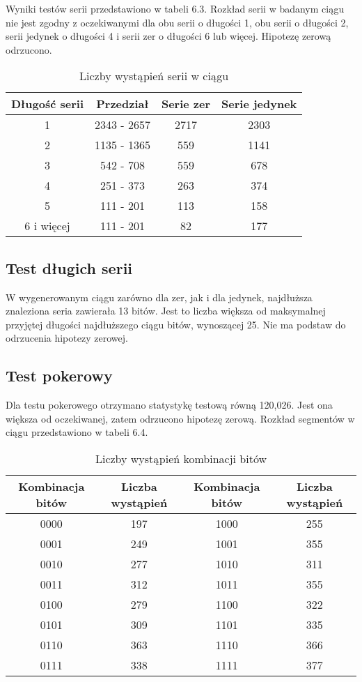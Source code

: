 Wyniki testów serii przedstawiono w tabeli 6.3. Rozkład serii w badanym ciągu nie jest zgodny z oczekiwanymi dla obu 
serii o długości 1, obu serii o długości 2, serii jedynek o długości 4 i serii zer o długości 6 lub więcej. Hipotezę
zerową odrzucono.
\begin{table}[h]
    \centering
    \caption{Liczby wystąpień serii w ciągu}
    \begin{tabular}{|c|c|c|c|} 
        \hline
        Długość serii & Przedział & Serie zer & Serie jedynek \\
        \hline
        1 & 2343 - 2657 & 2717 & 2303 \\
        \hline
        2 & 1135 - 1365 & 559 & 1141 \\
        \hline
        3 & 542 - 708 & 559 & 678 \\
        \hline
        4 & 251 - 373 & 263 & 374 \\
        \hline
        5 & 111 - 201 & 113 & 158 \\
        \hline
        6 i więcej & 111 - 201 & 82 & 177 \\
        \hline  
    \end{tabular} 
\end{table}   

\subsection{Test długich serii}
W wygenerowanym ciągu zarówno dla zer, jak i dla jedynek, najdłuższa znaleziona seria zawierała 13 bitów. Jest to liczba
większa od maksymalnej przyjętej długości najdłuższego ciągu bitów, wynoszącej 25. Nie ma podstaw do odrzucenia hipotezy 
zerowej.

\subsection{Test pokerowy}
Dla testu pokerowego otrzymano statystykę testową równą 120{,}026. Jest ona większa od oczekiwanej, zatem odrzucono 
hipotezę zerową. Rozkład segmentów w ciągu przedstawiono w tabeli 6.4.
\begin{table}[h]
    \centering
    \caption{Liczby wystąpień kombinacji bitów}
    \begin{tabular}{|c|c|c|c|} 
        \hline
        Kombinacja bitów & Liczba wystąpień & Kombinacja bitów & Liczba wystąpień \\
        \hline
        0000 & 197 & 1000 & 255 \\
        \hline
        0001 & 249 & 1001 & 355 \\
        \hline
        0010 & 277 & 1010 & 311 \\
        \hline
        0011 & 312 & 1011 & 355 \\
        \hline
        0100 & 279 & 1100 & 322 \\
        \hline
        0101 & 309 & 1101 & 335 \\
        \hline  
        0110 & 363 & 1110 & 366 \\
        \hline  
        0111 & 338 & 1111 & 377 \\
        \hline  
    \end{tabular} 
\end{table} 

